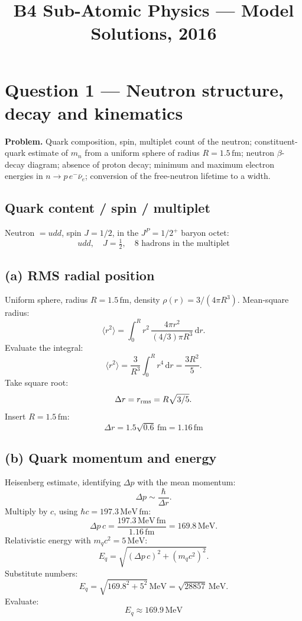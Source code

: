 \documentclass[11pt]{article}
\title{B4 Sub-Atomic Physics --- Model Solutions, 2016}
\author{}
\date{}
\newcommand{\de}{\mathrm{d}}
\newcommand{\MeV}{\,\mathrm{MeV}}
\newcommand{\fm}{\,\mathrm{fm}}
\begin{document}
\maketitle

\section*{Question 1 --- Neutron structure, decay and kinematics}

\textbf{Problem.} Quark composition, spin, multiplet count of the neutron; constituent-quark estimate of $m_n$ from a uniform sphere of radius $R=1.5\fm$; neutron $\beta$-decay diagram; absence of proton decay; minimum and maximum electron energies in $n\to p\,e^-\bar\nu_e$; conversion of the free-neutron lifetime to a width.

\subsection*{Quark content / spin / multiplet}

Neutron $= udd$, spin $J = 1/2$, in the $J^P = 1/2^+$ baryon octet:
\[
\boxed{\;udd,\quad J=\tfrac12,\quad 8 \text{ hadrons in the multiplet}\;}
\]

\subsection*{(a) RMS radial position}

Uniform sphere, radius $R=1.5\fm$, density $\rho(r)= 3/(4\pi R^3)$. Mean-square radius:
\[
\langle r^2\rangle = \int_0^R r^2\,\frac{4\pi r^2}{(4/3)\pi R^3}\,\de r.
\]
Evaluate the integral:
\[
\langle r^2\rangle = \frac{3}{R^3}\int_0^R r^4\,\de r = \frac{3R^2}{5}.
\]
Take square root:
\[
\Delta r = r_{\rm rms} = R\sqrt{3/5}.
\]
Insert $R=1.5\fm$:
\[
\boxed{\;\Delta r = 1.5\sqrt{0.6}\fm = 1.16\fm\;}
\]

\subsection*{(b) Quark momentum and energy}

Heisenberg estimate, identifying $\Delta p$ with the mean momentum:
\[
\Delta p \sim \frac{\hbar}{\Delta r}.
\]
Multiply by $c$, using $\hbar c = 197.3\MeV\fm$:
\[
\Delta p\, c = \frac{197.3\MeV\fm}{1.16\fm} = 169.8\MeV.
\]
Relativistic energy with $m_q c^2 = 5\MeV$:
\[
E_q = \sqrt{(\Delta p\, c)^2 + (m_q c^2)^2}.
\]
Substitute numbers:
\[
E_q = \sqrt{169.8^2 + 5^2}\MeV = \sqrt{28857}\MeV.
\]
Evaluate:
\[
\boxed{\;E_q \approx 169.9\MeV\;}
\]
\end{document}
